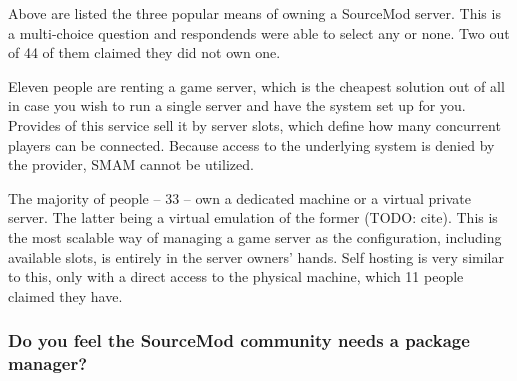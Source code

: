 \begin{figure}[H]
  \centering
\end{figure}

Above are listed the three popular means of owning a SourceMod server.
This is a multi-choice question and respondends were able to select any or none.
Two out of 44 of them claimed they did not own one.

Eleven people are renting a game server, which is the cheapest solution out of all in case you wish to run a single server and have the system set up for you.
Provides of this service sell it by server slots, which define how many concurrent players can be connected.
Because access to the underlying system is denied by the provider, SMAM cannot be utilized.

The majority of people -- 33 -- own a dedicated machine or a virtual private server.
The latter being a virtual emulation of the former (TODO: cite).
This is the most scalable way of managing a game server as the configuration, including available slots, is entirely in the server owners' hands.
Self hosting is very similar to this, only with a direct access to the physical machine, which 11 people claimed they have.

\subsubsection{Do you feel the SourceMod community needs a package manager?}

\begin{figure}[H]
  \centering
\end{figure}

